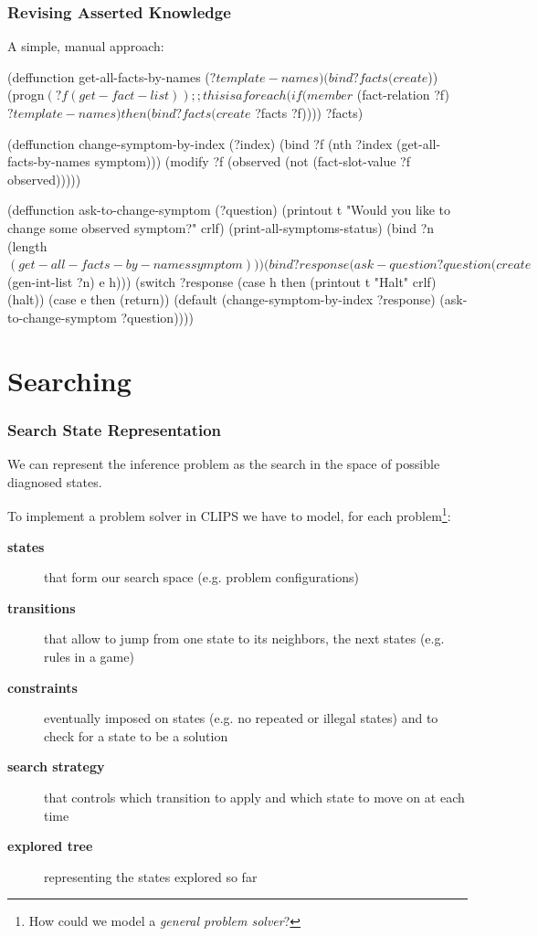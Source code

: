 \documentclass[xcolor={usenames,dvipsnames,svgnames}, compress]{beamer}
\begin{document}
\begin{frame}[fragile]
  \frametitle{Revising Asserted Knowledge}
  A simple, manual approach:
  \begin{clips-code}
    (deffunction get-all-facts-by-names ($?template-names)
        (bind ?facts (create$))
        (progn$ (?f (get-fact-list)) ;; this is a foreach
            (if (member$ (fact-relation ?f) $?template-names)
                then (bind ?facts (create$ ?facts ?f)))) ?facts)
    
    (deffunction change-symptom-by-index (?index)
        (bind ?f (nth ?index (get-all-facts-by-names symptom)))
        (modify ?f (observed (not (fact-slot-value ?f observed)))))

    (deffunction ask-to-change-symptom (?question)
        (printout t "Would you like to change some observed symptom?" crlf)
        (print-all-symptoms-status)
        (bind ?n (length$ (get-all-facts-by-names symptom)))
        (bind ?response (ask-question ?question (create$ (gen-int-list ?n) e h)))
        (switch ?response  (case h then (printout t "Halt" crlf) (halt))
                           (case e then (return)) 
                           (default (change-symptom-by-index ?response)
        (ask-to-change-symptom ?question))))
  \end{clips-code}
\end{frame}

\section{Searching}
{
  \begin{frame}
    \sectionpage
  \end{frame}
}

\begin{frame}
  \frametitle{Search State Representation}
  We can represent the inference problem as the search in the space of
  possible diagnosed states.\par
  To implement a problem solver in CLIPS we have to model, for each
  problem\footnote{How could we model a \emph{general problem solver}?}:
  \begin{description}
  \item[\textbf{states}] that form our search space (e.g. problem configurations)
  \item[\textbf{transitions}] that allow to jump from one state to its
    neighbors, the next states (e.g. rules in a game)
  \item[\textbf{constraints}] eventually imposed on states (e.g. no
    repeated or illegal states) and to check for a state to be a solution
    \item[\textbf{search strategy}] that controls which transition to
      apply and which state to move on at each time
    \item[\textbf{explored tree}] representing the states explored so far
  \end{description}
\end{frame}
\end{document}
